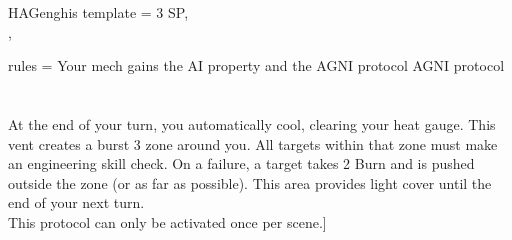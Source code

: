 \begin{mech}{HA}{Genghis}
template = {3 SP, \Unique \\
\AI},

rules = {Your mech gains the AI property and the AGNI protocol
AGNI protocol\\
\Protocol\\
\\
At the end of your turn, you automatically cool, clearing your heat gauge. This vent creates a burst 3 zone around you. All targets within that zone must make an engineering skill check. On a failure, a target takes 2 Burn and is pushed outside the zone (or as far as possible). This area provides light cover until the end of your next turn.\\
This protocol can only be activated once per scene.}]
\end{mech}
